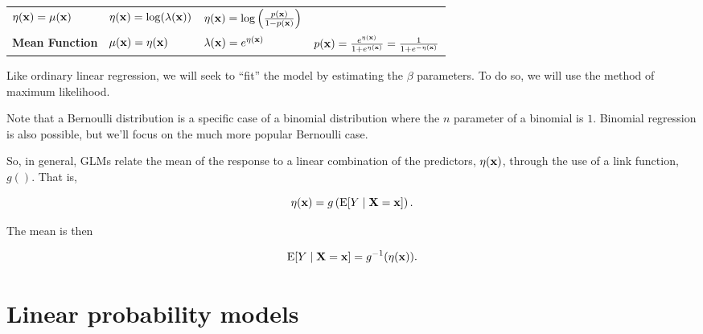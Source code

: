 \documentclass[]{book}
\begin{document}
\begin{longtable}[]{@{}llll@{}}
\begin{minipage}[t]{0.21\columnwidth}
\(\eta({\bf x}) = \mu({\bf x})\)\strut
\end{minipage} & \begin{minipage}[t]{0.23\columnwidth}\raggedright
\(\eta({\bf x}) = \log(\lambda({\bf x}))\)\strut
\end{minipage} & \begin{minipage}[t]{0.24\columnwidth}\raggedright
\(\eta({\bf x}) = \log \left(\frac{p({\bf x})}{1 - p({\bf x})} \right)\)\strut
\end{minipage}\tabularnewline
\begin{minipage}[t]{0.20\columnwidth}\raggedright
\textbf{Mean Function}\strut
\end{minipage} & \begin{minipage}[t]{0.21\columnwidth}\raggedright
\(\mu({\bf x}) = \eta({\bf x})\)\strut
\end{minipage} & \begin{minipage}[t]{0.23\columnwidth}\raggedright
\(\lambda({\bf x}) = e^{\eta({\bf x})}\)\strut
\end{minipage} & \begin{minipage}[t]{0.24\columnwidth}\raggedright
\(p({\bf x}) = \frac{e^{\eta({\bf x})}}{1 + e^{\eta({\bf x})}} = \frac{1}{1 + e^{-\eta({\bf x})}}\)\strut
\end{minipage}\tabularnewline
\bottomrule
\end{longtable}

Like ordinary linear regression, we will seek to ``fit'' the model by estimating the \(\beta\) parameters. To do so, we will use the method of maximum likelihood.

Note that a Bernoulli distribution is a specific case of a binomial distribution where the \(n\) parameter of a binomial is \(1\). Binomial regression is also possible, but we'll focus on the much more popular Bernoulli case.

So, in general, GLMs relate the mean of the response to a linear combination of the predictors, \(\eta({\bf x})\), through the use of a link function, \(g()\). That is,

\[
\eta({\bf x}) = g\left(\text{E}[Y \mid {\bf X} = {\bf x}]\right).
\]

The mean is then

\[
\text{E}[Y \mid {\bf X} = {\bf x}] = g^{-1}(\eta({\bf x})).
\]

\hypertarget{linear-probability-models}{%
\section{Linear probability models}\label{linear-probability-models}}
\end{document}
